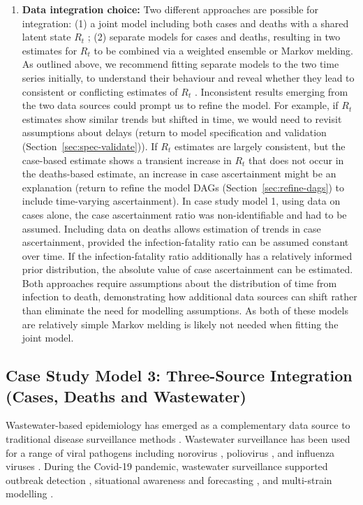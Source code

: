 \documentclass{article}
\begin{document}
\begin{enumerate}
    \item \textbf{Data integration choice:} 
       Two different approaches are possible for integration: (1) a joint model including both cases and deaths with a shared latent state $R_t$ \citep{scott2020epidemia}; (2) separate models for cases and deaths, resulting in two estimates for $R_t$ to be combined via a weighted ensemble or Markov melding.
        As outlined above, we recommend fitting separate models to the two time series initially, to understand their behaviour and reveal whether they lead to consistent or conflicting estimates of $R_t$ \citep{sherratt2021exploring}. Inconsistent results emerging from the two data sources could prompt us to refine the model. For example, if $R_t$ estimates show similar trends but shifted in time, we would need to revisit assumptions about delays (return to model specification and validation (Section~\ref{sec:spec-validate})). If $R_t$ estimates are largely consistent, but the case-based estimate shows a transient increase in $R_t$ that does not occur in the deaths-based estimate, an increase in case ascertainment might be an explanation (return to refine the model \ac{DAG}s (Section~\ref{sec:refine-dags}) to include time-varying ascertainment). In case study model 1, using data on cases alone, the case ascertainment ratio was non-identifiable and had to be assumed. Including data on deaths allows estimation of trends in case ascertainment, provided the infection-fatality ratio can be assumed constant over time. If the infection-fatality ratio additionally has a relatively informed prior distribution, the absolute value of case ascertainment can be estimated. Both approaches require assumptions about the distribution of time from infection to death, demonstrating how additional data sources can shift rather than eliminate the need for modelling assumptions. As both of these models are relatively simple Markov melding is likely not needed when fitting the joint model.
\end{enumerate}

\subsection{Case Study Model 3: Three-Source Integration (Cases, Deaths and Wastewater)}

Wastewater-based epidemiology has emerged as a complementary data source to traditional disease surveillance methods \citep{keshaviah2023wastewater}. Wastewater surveillance has been used for a range of viral pathogens including norovirus \citep{zheng2024tracking}, poliovirus \citep{whitehouse2024wastewater}, and influenza viruses \citep{zheng2023development}. During the Covid-19 pandemic, wastewater surveillance supported outbreak detection \citep{hewitt2022sensitivity}, situational awareness and forecasting \citep{varkila2023use,jin2024combining}, and multi-strain modelling \citep{dreifuss2025estimated}. 
\end{document}
